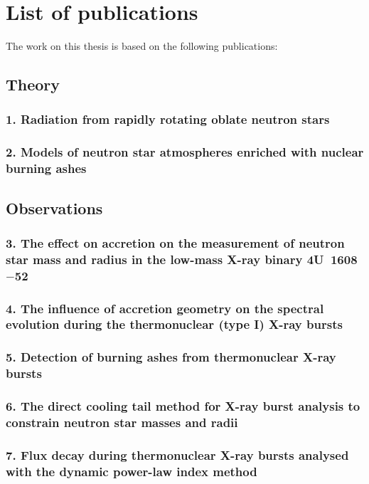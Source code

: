 \chapter*{List of publications}

The work on this thesis is based on the following publications:

\section*{Theory}
\subsection*{1. Radiation from rapidly rotating oblate neutron stars}

\subsection*{2. Models of neutron star atmospheres enriched with nuclear burning ashes}


\section*{Observations}
\subsection*{3. The effect on accretion on the measurement of neutron star mass and radius in the low-mass X-ray binary 4U~1608$-$52}

\subsection*{4. The influence of accretion geometry on the spectral evolution during the thermonuclear (type I) X-ray bursts}

\subsection*{5. Detection of burning ashes from thermonuclear X-ray bursts}

\subsection*{6. The direct cooling tail method for X-ray burst analysis to constrain neutron star masses and radii}

\subsection*{7. Flux decay during thermonuclear X-ray bursts analysed with the dynamic power-law index method}

